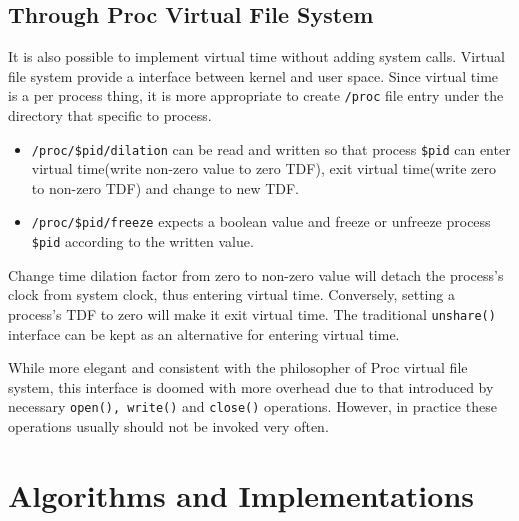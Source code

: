 \documentclass{acm_proc_article-sp}
\begin{document}
\subsection{Through Proc Virtual File System}
It is also possible to implement virtual time without adding system calls. Virtual file system provide a interface between kernel and user space. Since virtual time is a per process thing, it is more appropriate to create \texttt{/proc} file entry under the directory that specific to process.
\begin{itemize}
\item \texttt{/proc/\$pid/dilation} can be read and written so that process \texttt{\$pid} can enter virtual time(write non-zero value to zero TDF), exit virtual time(write zero to non-zero TDF) and change to new TDF.
\item \texttt{/proc/\$pid/freeze} expects a boolean value and freeze or unfreeze process \texttt{\$pid} according to the written value. 
\end{itemize}
Change time dilation factor from zero to non-zero value will detach the process's clock from system clock, thus entering virtual time. Conversely, setting a process's TDF to zero will make it exit virtual time. The traditional \texttt{unshare()} interface can be kept as an alternative for entering virtual time.

While more elegant and consistent with the philosopher of Proc virtual file system, this interface is doomed with more overhead due to that introduced by necessary \texttt{open(), write()} and \texttt{close()} operations. However, in practice these operations usually should not be invoked very often.

\section{Algorithms and Implementations}
\end{document}
